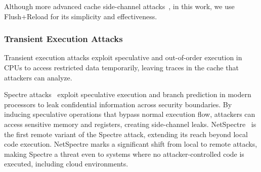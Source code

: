 
Although more advanced cache side-channel attacks~\cite{irazoqui2015s, disselkoen2017prime+, purnal2021prime+}, in this work, we use Flush+Reload for its simplicity and effectiveness.


\subsubsection{Transient Execution Attacks}

Transient execution attacks exploit speculative and out-of-order execution in CPUs to access restricted data temporarily, leaving traces in the cache that attackers can analyze. 

Spectre attacks~\cite{kocher2019spectre} exploit speculative execution and branch prediction in modern processors to leak confidential information across security boundaries. By inducing speculative operations that bypass normal execution flow, attackers can access sensitive memory and registers, creating side-channel leaks. NetSpectre~\cite{schwarz2019netspectre} is the first remote variant of the Spectre attack, extending its reach beyond local code execution. NetSpectre marks a significant shift from local to remote attacks, making Spectre a threat even to systems where no attacker-controlled code is executed, including cloud environments.

